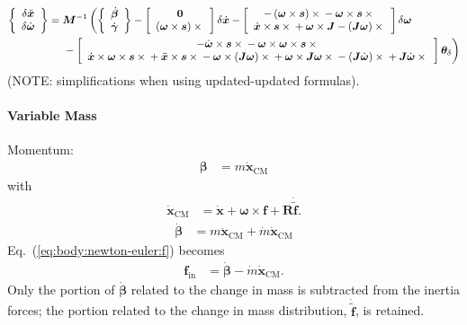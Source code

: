 \documentclass[10pt,dvips,fleqn,subeqn]{report}
\newcommand{\T}[1]{\bm{#1}}
\newcommand{\TT}[1]{\bm{#1}}
\begin{document}
\begin{align}
	\cubr{\cvvect{
		\delta\ddot{\T{x}}
		\\
		\delta\dot{\T{\omega}}
	}}
	&=
	\TT{M}^{-1} \lplbr{
		\cubr{\cvvect{
			\dot{\T{\beta}}
			\\
			\dot{\T{\gamma}}
		}}
		-
		\sqbr{\cvvect{
			\T{0}
			\\
			\plbr{\T{\omega} \times \T{s}}\times{}
		}} \delta\dot{\T{x}}
		-
		\sqbr{\cvvect{
			- \plbr{\T{\omega} \times \T{s}} \times{}
			- \T{\omega} \times \T{s} \times{}
			\\
			\dot{\T{x}} \times \T{s} \times{}
			+
			\T{\omega} \times \TT{J}
			-
			\plbr{\TT{J} \T{\omega}} \times {}
		}} \delta\T{\omega}
	}
	\nonumber \\ &\rplbr{\mbox{\hphantom{= }}
		- \sqbr{\cvvect{
			-\dot{\T{\omega}} \times \T{s} \times{}
			- \T{\omega} \times \T{\omega} \times \T{s} \times{}
			\\
			\dot{\T{x}} \times \T{\omega} \times \T{s} \times{}
			+
			\ddot{\T{x}} \times \T{s} \times{}
			-
			\T{\omega} \times \plbr{\TT{J} \T{\omega}} \times{}
			+
			\T{\omega} \times \T{J} \T{\omega} \times{}
			-
			\plbr{\TT{J} \dot{\T{\omega}}} \times{}
			+
			\TT{J} \dot{\T{\omega}} \times{}
		}}\T{\theta}_{\delta}
	}
\end{align}
(NOTE: simplifications when using updated-updated formulas).



\paragraph{Variable Mass}
Momentum:
\begin{align}
	\T{\beta}
	&=
	m \dot{\T{x}}_\text{CM}
\end{align}
with
\begin{align}
	\dot{\T{x}}_\text{CM}
	&=
	\dot{\T{x}}
	+
	\T{\omega} \times \T{f}
	+
	\TT{R} \dot{\tilde{\T{f}}}
	.
\end{align}
\begin{align}
	\dot{\T{\beta}}
	&=
	m \ddot{\T{x}}_\text{CM}
	+
	\dot{m} \dot{\T{x}}_\text{CM}
\end{align}
Eq.~(\ref{eq:body:newton-euler:f}) becomes
\begin{align}
	\T{f}_\text{in}
	&=
	\dot{\T{\beta}}
	-
	\dot{m} \dot{\T{x}}_\text{CM}
	.
\end{align}
Only the portion of $\dot{\T{\beta}}$ related to the change in mass
is subtracted from the inertia forces; the portion related
to the change in mass distribution, $\dot{\tilde{\T{f}}}$, is retained.
\end{document}
